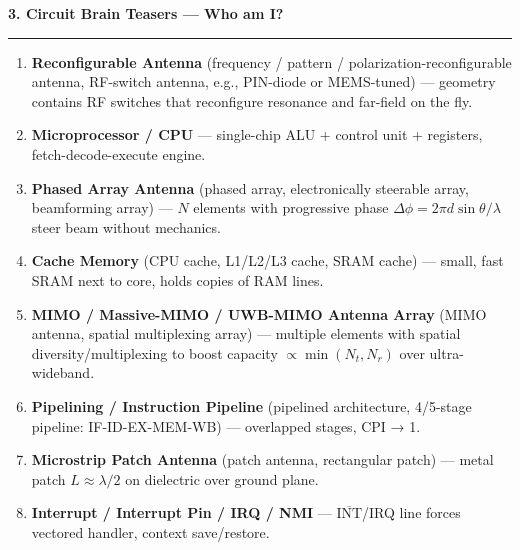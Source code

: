 \vspace{0.25em}

\begin{tcolorbox}[
  colback=black!2,
  colframe=IEEEblue!75!black,
  boxrule=0.6pt,
  arc=0mm,
  left=4mm, right=4mm, top=1.5mm, bottom=1.5mm
]
{\large\bfseries\rmfamily\color{IEEEblue} 3. Circuit Brain Teasers — Who am I?\par}
\vspace{0.15em}
{\color{IEEEorange}\rule{\linewidth}{0.8pt}}\par
\smallskip
\footnotesize\rmfamily
\begin{enumerate}[leftmargin=1.9em,itemsep=1pt,topsep=0pt,parsep=0pt]
  \item \textbf{Reconfigurable Antenna} (frequency / pattern / polarization-reconfigurable antenna, RF-switch antenna, e.g., PIN-diode or MEMS-tuned) — geometry contains RF switches that reconfigure resonance and far-field on the fly.

  \item \textbf{Microprocessor / CPU} — single-chip ALU + control unit + registers, fetch-decode-execute engine.

  \item \textbf{Phased Array Antenna} (phased array, electronically steerable array, beamforming array) — $N$ elements with progressive phase $\Delta\phi = 2\pi d \sin\theta/\lambda$ steer beam without mechanics.

  \item \textbf{Cache Memory} (CPU cache, L1/L2/L3 cache, SRAM cache) — small, fast SRAM next to core, holds copies of RAM lines.

  \item \textbf{MIMO / Massive-MIMO / UWB-MIMO Antenna Array} (MIMO antenna, spatial multiplexing array) — multiple elements with spatial diversity/multiplexing to boost capacity $\propto \min(N_t,N_r)$ over ultra-wideband.

  \item \textbf{Pipelining / Instruction Pipeline} (pipelined architecture, 4/5-stage pipeline: IF-ID-EX-MEM-WB) — overlapped stages, CPI → 1.

  \item \textbf{Microstrip Patch Antenna} (patch antenna, rectangular patch) — metal patch $L\approx\lambda/2$ on dielectric over ground plane.

  \item \textbf{Interrupt / Interrupt Pin / IRQ / NMI} — $\overline{\text{INT}}$/IRQ line forces vectored handler, context save/restore.


\end{enumerate}
\end{tcolorbox}
